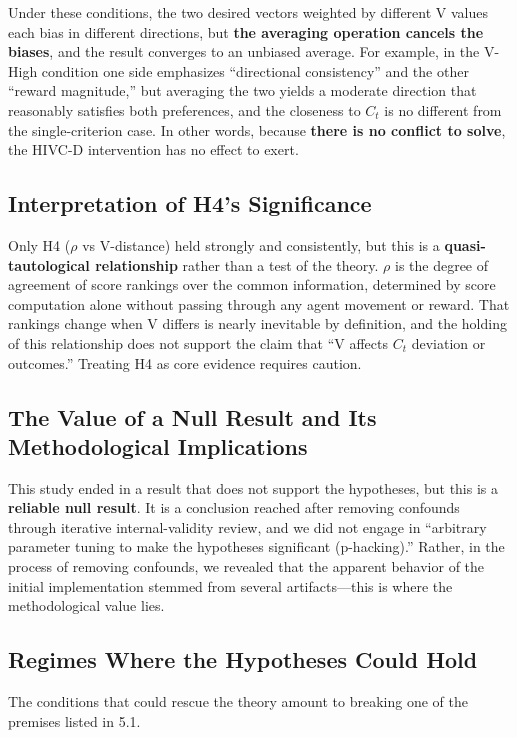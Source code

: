 \documentclass[11pt]{article}
\newcommand{\Ct}{\ensuremath{C_t}}
\begin{document}
Under these conditions, the two desired vectors weighted by different V values each bias in different directions, but \textbf{the averaging operation cancels the biases}, and the result converges to an unbiased average. For example, in the V-High condition one side emphasizes ``directional consistency'' and the other ``reward magnitude,'' but averaging the two yields a moderate direction that reasonably satisfies both preferences, and the closeness to \Ct{} is no different from the single-criterion case. In other words, because \textbf{there is no conflict to solve}, the HIVC-D intervention has no effect to exert.

\subsection{Interpretation of H4's Significance}

Only H4 ($\rho$ vs V-distance) held strongly and consistently, but this is a \textbf{quasi-tautological relationship} rather than a test of the theory. $\rho$ is the degree of agreement of score rankings over the common information, determined by score computation alone without passing through any agent movement or reward. That rankings change when V differs is nearly inevitable by definition, and the holding of this relationship does not support the claim that ``V affects \Ct{} deviation or outcomes.'' Treating H4 as core evidence requires caution.

\subsection{The Value of a Null Result and Its Methodological Implications}

This study ended in a result that does not support the hypotheses, but this is a \textbf{reliable null result}. It is a conclusion reached after removing confounds through iterative internal-validity review, and we did not engage in ``arbitrary parameter tuning to make the hypotheses significant (p-hacking).'' Rather, in the process of removing confounds, we revealed that the apparent behavior of the initial implementation stemmed from several artifacts---this is where the methodological value lies.

\subsection{Regimes Where the Hypotheses Could Hold}

The conditions that could rescue the theory amount to breaking one of the premises listed in 5.1.
\end{document}
